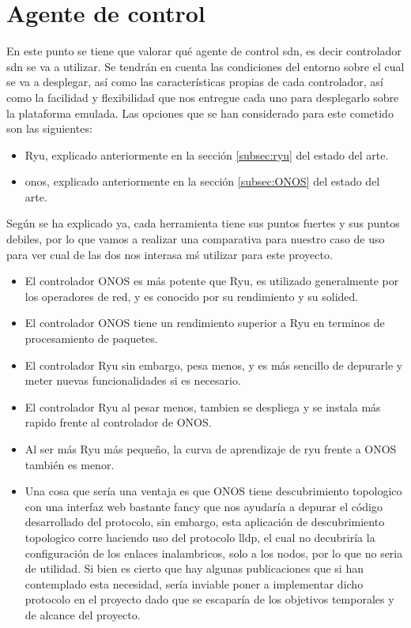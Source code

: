 \section{Agente de control }
\label{sec:ana_controller}

En este punto se tiene que valorar qué agente de control \gls{sdn}, es decir controlador \gls{sdn} se va a utilizar. Se tendrán en cuenta las condiciones del entorno sobre el cual se va a desplegar, así como las características propias de cada controlador, así como la facilidad y flexibilidad que nos entregue cada uno para desplegarlo sobre la plataforma emulada. Las opciones que se han considerado para este cometido son las siguientes:

\begin{itemize}
    \item Ryu, explicado anteriormente en la sección \ref{subsec:ryu} del estado del arte.

    \item \gls{onos}, explicado anteriormente en la sección \ref{subsec:ONOS} del estado del arte.
\end{itemize}

Según se ha explicado ya, cada herramienta tiene sus puntos fuertes y sus puntos debiles, por lo que vamos a realizar una comparativa para nuestro caso de uso para ver cual de las dos nos interasa mś utilizar para este proyecto.

\begin{itemize}
    \item El controlador ONOS es más potente que Ryu, es utilizado generalmente por los operadores de red, y es conocido por su rendimiento y su solided.
    \item El controlador ONOS tiene un rendimiento superior a Ryu en terminos de procesamiento de paquetes.
    \item El controlador Ryu sin embargo, pesa menos, y es más sencillo de depurarle y meter nuevas funcionalidades si es necesario.
    \item El controlador Ryu al pesar menos, tambien se despliega y se instala más rapido frente al controlador de ONOS.
    \item Al ser más Ryu más pequeño, la curva de aprendizaje de ryu frente a ONOS también es menor.
    \item Una cosa que sería una ventaja es que ONOS tiene descubrimiento topologico con una interfaz web bastante fancy que nos ayudaría a depurar el código desarrollado del protocolo, sin embargo, esta aplicación de descubrimiento topologico corre haciendo uso del protocolo \gls{lldp}, el cual no decubriría la configuración de los enlaces inalambricos, solo a los nodos, por lo que no seria de utilidad. Si bien es cierto que hay algunas publicaciones que si han contemplado esta necesidad, sería inviable poner a implementar dicho protocolo en el proyecto dado que se escaparía de los objetivos temporales y de alcance del proyecto.
\end{itemize}